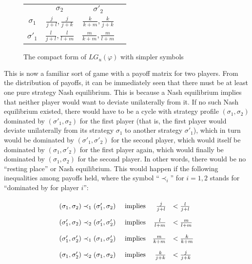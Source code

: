 \begin{figure}[h]
\renewcommand{\arraystretch}{2.0}
\begin{tabular}{c|c|c|c}
\multicolumn{1}{c}{} & \multicolumn{1}{c}{$\sigma_2$} & \multicolumn{1}{c}{$\sigma'_2$} \\[.5ex]
 \cline{2-3}
$\sigma_1$ & $\frac{j}{j+l}, \frac{j}{j + k}$ & $\frac{k}{k+m}, \frac{k}{j + k}$ & \qquad \\[.5ex]
 \cline{2-3}
 $\sigma'_1$ & $\frac{l}{j + l}, \frac{l}{l + m}$ & $\frac{m}{k+m}, \frac{m}{l + m}$ & \qquad \\[.5ex]
 \cline{2-3}
 \end{tabular}
 \caption{The compact form of $LG_u(\varphi)$ with simpler symbols} \label{fig:compact form 2}
\end{figure}

This is now a familiar sort of game with a payoff matrix for two players. From the distribution of payoffs, it can be immediately seen that there must be at least one pure strategy Nash equilibrium. This is because a Nash equilibrium implies that neither player would want to deviate unilaterally from it. If no such Nash equilibrium existed, there would have to be a cycle with strategy profile $(\sigma_1,\sigma_2)$ dominated by $(\sigma'_1,\sigma_2)$ for the first player (that is, the first player would deviate unilaterally from its strategy $\sigma_1$ to another strategy $\sigma'_1$), which in turn would be dominated by $(\sigma'_1,\sigma'_2)$ for the second player, which would itself be dominated by $(\sigma_1,\sigma'_2)$ for the first player again, which would finally be dominated by $(\sigma_1,\sigma_2)$ for the second player. In other words, there would be no ``resting place'' or Nash equilibrium. This would happen if the following inequalities among payoffs held, where the symbol ``$\prec_i$'' for $i = 1, 2$ stands for ``dominated by for player $i$'':
\[\renewcommand{\arraystretch}{2.0}\begin{array}{lcrl}
(\sigma_1,\sigma_2) \prec_1 (\sigma'_1,\sigma_2)   & \ \hbox{implies} & \frac{j}{j + l} & < \frac{l}{j + l}\\
(\sigma'_1,\sigma_2) \prec_2 (\sigma'_1,\sigma'_2) & \ \hbox{implies} & \frac{l}{l + m} & < \frac{m}{l + m}\\
(\sigma'_1,\sigma'_2) \prec_1 (\sigma_1,\sigma'_2) & \ \hbox{implies} & \frac{m}{k + m} & < \frac{k}{k + m}\\
(\sigma_1,\sigma'_2) \prec_2 (\sigma_1,\sigma_2)   & \ \hbox{implies} & \frac{k}{j + k} & < \frac{j}{j + k}\\
\end{array}\]

